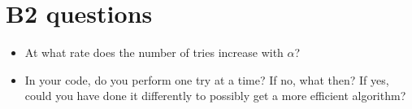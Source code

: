 \documentclass[11pt,a4paper,oneside]{article}
\begin{document}
\section{B2 questions}

\begin{itemize}
    \item 
    At what rate does the number of tries increase with $\alpha$?
    \item 
    In your code, do you perform one try at a time? If no, what then? If yes, could you have done it differently to possibly get a more efficient algorithm?
\end{itemize}
\end{document}
